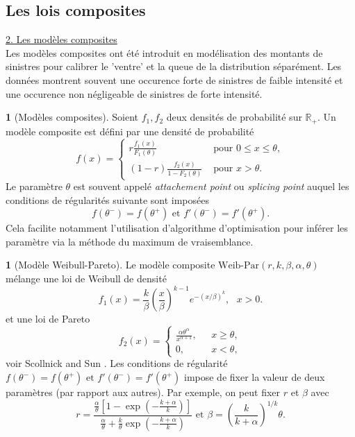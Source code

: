 \documentclass[8pt,notheorems]{beamer}
\newcommand{\R}{\mathbb{R}}
\theoremstyle{definition}
\newtheorem{definition}{\translate{Definition}}
\theoremstyle{example}
\newtheorem{example}{\translate{Example}}
\theoremstyle{mystyle}
\theoremstyle{plain}
\begin{document}
\subsection{Les lois composites}
\begin{frame}[allowframebreaks]
\underline{2. Les modèles composites}\\

Les modèles composites ont été introduit en modélisation des montants de sinistres pour calibrer le 'ventre' et la queue de la distribution séparément. Les données montrent souvent une occurence forte de sinistres de faible intensité et une occurence non négligeable de sinistres de forte intensité.
\begin{definition}[Modèles composites]
Soient $f_1, f_2$ deux densités de probabilité sur $\R_+$. Un modèle composite est défini par une densité de probabilité
$$
f(x) = \begin{cases}
r\frac{f_1(x)}{F_1(\theta)}&\text{ pour }0\leq x\leq \theta,\\
(1-r)\frac{f_2(x)}{1-F_2(\theta)}&\text{ pour } x> \theta.
\end{cases}
$$
Le paramètre $\theta$ est souvent appelé \textit{attachement point} ou \textit{splicing point} auquel les conditions de régularités suivante sont imposées
$$
f(\theta^-  ) = f(\theta^+ )\text{ et }f'(\theta^-  ) = f'(\theta^+ ).
$$
Cela facilite notamment l'utilisation d'algorithme d'optimisation pour inférer les paramètre via la méthode du maximum de vraisemblance.
\end{definition}
\begin{example}[Modèle Weibull-Pareto]
Le modèle composite $\text{Weib-Par}(r,k,\beta,\alpha, \theta)$ mélange une loi de Weibull de densité
$$
f_{1}(x)=\frac{k}{\beta}\left(\frac{x}{\beta}\right)^{k-1}e^{-(x/\beta)^k},\text{ }x>0.
$$
et une loi de Pareto
$$
f_2(x)=
\begin{cases}
\frac{\alpha \theta^\alpha}{x^{\alpha+1}},&\text{ }x\geq \theta,\\
0,&\text{ }x< \theta,
\end{cases}
$$
voir Scollnick and Sun \cite{scollnik2012modeling}. Les conditions de régularité
$f(\theta^-  ) = f(\theta^+ )\text{ et }f'(\theta^-  ) = f'(\theta^+ )$ impose de fixer la valeur de deux paramètres (par rapport aux autres). Par exemple, on peut fixer $r$ et $\beta$ avec
$$
r = \frac{\frac{\alpha}{\theta}\left[1-\exp\left(-\frac{k+\alpha}{k}\right)\right]}{\frac{\alpha}{\theta}+\frac{k}{\theta}\exp\left(-\frac{k+\alpha}{k}\right)}\text{ et }\beta = \left(\frac{k}{k+\alpha}\right)^{1/k}\theta.
$$
\end{example}
\end{frame}
\end{document}

